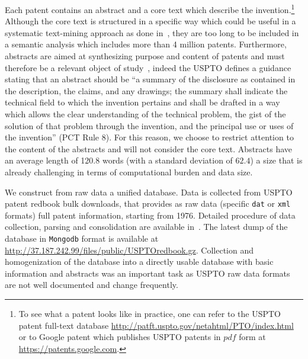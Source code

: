 \documentclass[10pt,A4]{article}
\begin{document}
Each patent contains an abstract and a core text which describe the invention.\footnote{To see what a patent looks like in practice, one can refer to the USPTO patent full-text database \url{http://patft.uspto.gov/netahtml/PTO/index.html} or to Google patent which publishes USPTO patents in $pdf$ form at \url{https://patents.google.com}.} Although the core text is structured in a specific way which could be useful in a systematic text-mining approach as done in~\cite{tseng2007text}, they are too long to be included in a semantic analysis which includes more than 4 million patents. Furthermore, abstracts are aimed at synthesizing purpose and content of patents and must therefore be a relevant object of study~\cite{Adams2010text}, indeed the USPTO defines a guidance stating that an abstract should be ``a summary of the disclosure as contained in the description, the claims, and any drawings; the summary shall indicate the technical field to which the invention pertains and shall be drafted in a way which allows the clear understanding of the technical problem, the gist of the solution of that problem through the invention, and the principal use or uses of the invention'' (PCT Rule 8). For this reason, we choose to restrict attention to the content of the abstracts and will not consider the core text. Abstracts have an average length of 120.8 words (with a standard deviation of $62.4$) a size that is already challenging in terms of computational burden and data size.

We construct from raw data a unified database. Data is collected from USPTO patent redbook bulk downloads, that provides as raw data (specific \texttt{dat} or \texttt{xml} formats) full patent information, starting from 1976. Detailed procedure of data collection, parsing and consolidation are available in~. The latest dump of the database in \texttt{Mongodb} format is available at \url{http://37.187.242.99/files/public/USPTOredbook.gz}.
Collection and homogenization of the database into a directly usable database with basic information and abstracts was an important task as USPTO raw data formats are not well documented and change frequently.
\end{document}
